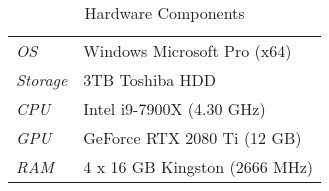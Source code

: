 \begin{table}[hbt!]
\centering
\caption{Hardware Components}
\label{Hardware components}
\begin{tabular}{l|l}
\hline
\textit{OS}      & Windows Microsoft Pro (x64)   \\
\textit{Storage} & 3TB Toshiba HDD               \\
\textit{CPU}     & Intel i9-7900X (4.30 GHz)     \\
\textit{GPU}     & GeForce RTX 2080 Ti (12 GB)   \\
\textit{RAM}     & 4 x 16 GB Kingston (2666 MHz)
\end{tabular}
\end{table}
